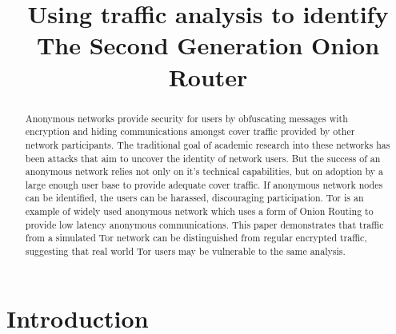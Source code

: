 \documentclass[conference]{IEEEtran}
\begin{document}
\title{Using traffic analysis to identify The Second Generation Onion Router}

\author{
  \and
  \and
}

\maketitle

\begin{abstract}
Anonymous networks provide security for users by obfuscating messages with
encryption and hiding communications amongst cover traffic provided by other
network participants. The traditional goal of academic research into these
networks has been attacks that aim to uncover the identity of network users.
But the success of an anonymous network relies not only on it's technical
capabilities, but on adoption by a large enough user base to provide adequate
cover traffic. If anonymous network nodes can be identified, the users
can be harassed, discouraging participation. Tor is an example of widely used
anonymous network which uses a form of Onion Routing to provide low latency
anonymous communications. This paper demonstrates that traffic from a simulated
Tor network can be distinguished from regular encrypted traffic, suggesting that
real world Tor users may be vulnerable to the same analysis.
\end{abstract}

\section{Introduction}
\end{document}
